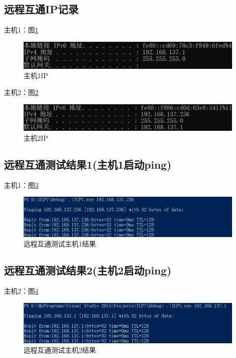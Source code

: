 \documentclass[a4paper]{ctexrep}
\begin{document}
\begin{spacing}{1.5}
\subsection{远程互通IP记录}
主机1：图\ref{IP1}
\begin{figure}[htbp]
	\centering
	\includegraphics [width=1\textwidth]{figure//IP1.png}
	\caption{主机1IP}\label{IP1}
\end{figure}

主机2：图\ref{IP2}
\begin{figure}[htbp]
	\centering
	\includegraphics [width=1\textwidth]{figure//IP2.png}
	\caption{主机2IP}\label{IP2}
\end{figure}

\newpage
\subsection{远程互通测试结果1(主机1启动ping)}
主机1：图\ref{remote2}
\begin{figure}[htbp]
	\centering
	\includegraphics [width=1\textwidth]{figure//res_remote2.png}
	\caption{远程互通测试主机1结果}\label{remote2}
\end{figure}

\subsection{远程互通测试结果2(主机2启动ping)}
主机2：图\ref{remote1}
\begin{figure}[htbp]
	\centering
	\includegraphics [width=1\textwidth]{figure//res_remote1.png}
	\caption{远程互通测试主机2结果}\label{remote1}
\end{figure}


\end{spacing}
\end{document}
